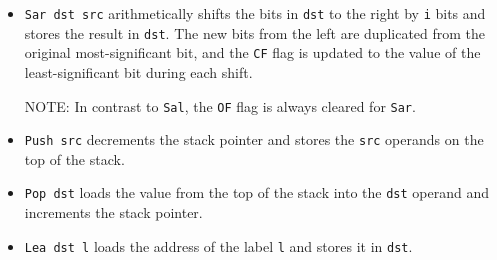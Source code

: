 \documentclass{article}
\begin{document}
{\begin{itemize}
    NOTE: When \texttt{i} is \texttt{1}, the \texttt{OF} flag is set if the
    most-significant bit of the result is different from the value of the
    \texttt{CF} flag, and cleared if they are the same.
  \item \texttt{Sar dst src} arithmetically shifts the bits in \texttt{dst} to
    the right by \texttt{i} bits and stores the result in \texttt{dst}. The new
    bits from the left are duplicated from the original most-significant bit,
    and the \texttt{CF} flag is updated to the value of the least-significant
    bit during each shift.

    NOTE: In contrast to \texttt{Sal}, the \texttt{OF} flag is always cleared
    for \texttt{Sar}.
  \item \texttt{Push src} decrements the stack pointer and stores the
    \texttt{src} operands on the top of the stack.
  \item \texttt{Pop dst} loads the value from the top of the stack into the
    \texttt{dst} operand and increments the stack pointer.
  \item \texttt{Lea dst l} loads the address of the label \texttt{l} and stores
    it in \texttt{dst}.
  \end{itemize}
}
\end{document}
